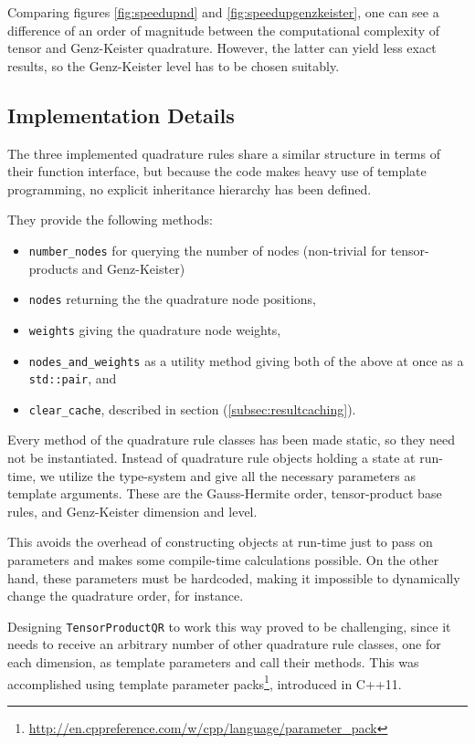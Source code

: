 Comparing figures \ref{fig:speedupnd} and \ref{fig:speedupgenzkeister}, one can
see a difference of an order of magnitude between the computational complexity
of tensor and Genz-Keister quadrature.
However, the latter can yield less exact results, so the Genz-Keister level has
to be chosen suitably.


\subsection{Implementation Details}

The three implemented quadrature rules share a similar structure in terms of
their function interface, but because the code makes heavy use of template
programming, no explicit inheritance hierarchy has been defined.

They provide the following methods:
\begin{itemize}
  \item \texttt{number\_nodes} for querying the number of nodes (non-trivial for
    tensor-products and Genz-Keister)
  \item \texttt{nodes} returning the the quadrature node positions,
  \item \texttt{weights} giving the quadrature node weights,
  \item \texttt{nodes\_and\_weights} as a utility method giving both of the
    above at once as a \texttt{std::pair}, and
  \item \texttt{clear\_cache}, described in section
    (\ref{subsec:resultcaching}).
\end{itemize}

Every method of the quadrature rule classes has been made static, so they need
not be instantiated.
Instead of quadrature rule objects holding a state at run-time, we utilize the
type-system and give all the necessary parameters as template arguments.
These are the Gauss-Hermite order, tensor-product base rules, and Genz-Keister
dimension and level.

This avoids the overhead of constructing objects at run-time just to pass on
parameters and makes some compile-time calculations possible.
On the other hand, these parameters must be hardcoded, making it impossible to
dynamically change the quadrature order, for instance.

Designing \texttt{TensorProductQR} to work this way proved to be challenging,
since it needs to receive an arbitrary number of other quadrature rule classes,
one for each dimension, as template parameters and call their methods.
This was accomplished using template parameter
packs\footnote{\url{http://en.cppreference.com/w/cpp/language/parameter_pack}},
introduced in C++11.


